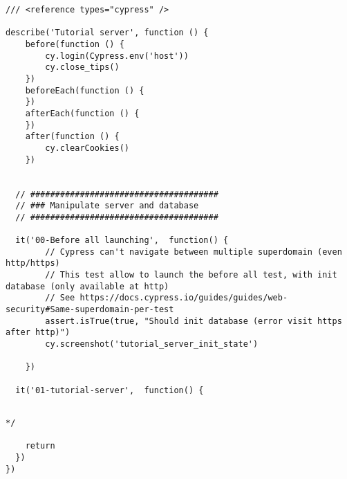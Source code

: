 
\begin{verbatim}
/// <reference types="cypress" />

describe('Tutorial server', function () {
    before(function () {
        cy.login(Cypress.env('host'))
        cy.close_tips()
    })
    beforeEach(function () {
    })
    afterEach(function () {
    })
    after(function () {
        cy.clearCookies()
    })


  // ######################################
  // ### Manipulate server and database
  // ######################################

  it('00-Before all launching',  function() {
        // Cypress can't navigate between multiple superdomain (even http/https)
        // This test allow to launch the before all test, with init database (only available at http)
        // See https://docs.cypress.io/guides/guides/web-security#Same-superdomain-per-test
        assert.isTrue(true, "Should init database (error visit https after http)")
        cy.screenshot('tutorial_server_init_state')

    })

  it('01-tutorial-server',  function() {


\end{verbatim}



\begin{verbatim}
*/

    return
  })
})

\end{verbatim}
